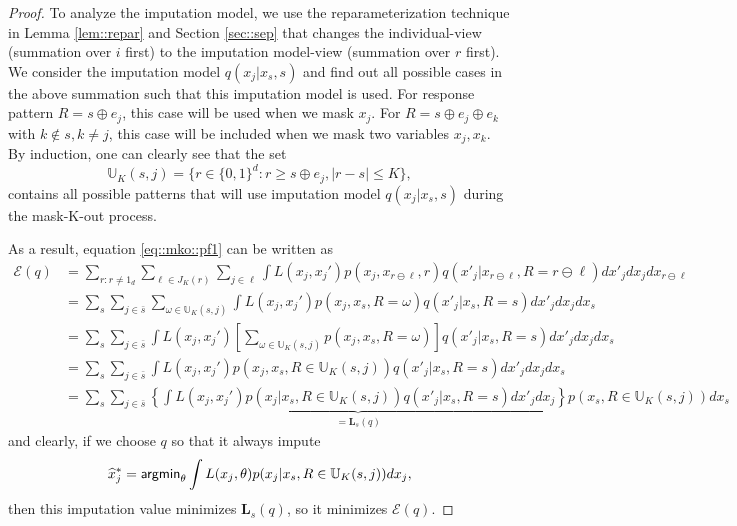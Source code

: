 \documentclass[aos, preprint]{imsart}
\theoremstyle{plain}
\theoremstyle{definition}
\let\hat\widehat
\begin{document}
\begin{appendix}
\begin{proof}
To analyze the imputation model,
we use the reparameterization technique in Lemma \ref{lem::repar} and Section \ref{sec::sep}
that changes the individual-view (summation over $i$ first)
to the imputation model-view (summation over $r$ first).
We consider
the imputation model $q(x_j|x_s, s)$ and  find out all possible cases in the above summation
such that this imputation model is used. 
For response pattern $R = s\oplus e_j$, this case will be used when we mask  $x_j$.
For $R = s\oplus e_j \oplus e_k$ with $k\notin s, k\neq j$, this case will be included when 
we mask two variables $x_j,x_k$. 
By induction, one can clearly see that 
the set
$$
\mathbb{U}_K(s, j)  = \{r\in\{0,1\}^d: r \geq s\oplus e_j, |r-s|\leq K\},
$$
contains all possible patterns that will use imputation model $q(x_j|x_s, s)$
during the mask-K-out process. 

As a result, 
equation \eqref{eq::mko::pf1} can be written as 
\begin{align*}
\mathcal{E}(q)&=  \sum_{r:r\neq 1_d} \sum_{\ell \in J_K(r)}\sum_{j \in \ell} \int L(x_j, x_j') p(x_j, x_{r\ominus \ell},r) q(x'_j|x_{r\ominus \ell},R=r\ominus \ell)dx'_j dx_j dx_{r\ominus \ell}\\
& = \sum_s\sum_{j \in  \bar s} \sum_{\omega\in \mathbb{U}_K(s, j)} \int L(x_j, x_j') p(x_j, x_{s},R=\omega) q(x'_j|x_{s},R=s)dx'_j dx_j dx_{s}\\
& = \sum_s\sum_{j \in  \bar s}  \int L(x_j, x_j') \left[\sum_{\omega\in \mathbb{U}_K(s, j)} p(x_j, x_{s},R=\omega)\right] q(x'_j|x_{s},R=s)dx'_j dx_j dx_{s}\\
& = \sum_s\sum_{j \in \bar s}  \int L(x_j, x_j') p(x_j, x_{s},R\in \mathbb{U}_K(s, j)) q(x'_j|x_{s},R=s)dx'_j dx_j dx_{s}\\
& = \sum_s\sum_{j \in  \bar s}  \underbrace{\left\{\int L(x_j, x_j') p(x_j| x_{s},R\in \mathbb{U}_K(s, j)) q(x'_j|x_{s},R=s)dx'_j dx_j\right\}}_{= \mathbf{L}_s(q)} p( x_{s},R\in \mathbb{U}_K(s, j))dx_{s}
\end{align*}
and clearly, 
if we choose $q$ so that it always impute 
$$
\hat x^*_j = {\sf argmin}_{\theta} \int L( x_j,\theta ) p(x_j|x_{s}, R\in \mathbb{U}_K(s, j))dx_j,
$$
then this imputation value minimizes $\mathbf{L}_s(q)$, so it minimizes $\mathcal{E}(q)$.


\end{proof}
\end{appendix}
\end{document}
